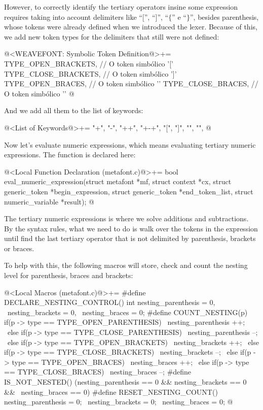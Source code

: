However, to correctly identify the tertiary operators insine some
expression requires taking into account delimiters like ``['',
``]'', ``$\{$'' e ``$\}$'', besides parenthesis, whose tokens were
already defined when we introduced the lexer. Because of this, we add
new token types for the delimiters that still were not defined:

\iniciocodigo
@<WEAVEFONT: Symbolic Token Definition@>+=
TYPE_OPEN_BRACKETS,         // O token simbólico '['
TYPE_CLOSE_BRACKETS,        // O token simbólico ']'
TYPE_OPEN_BRACES,           // O token simbólico '{'
TYPE_CLOSE_BRACES,          // O token simbólico '}'
@
\fimcodigo

And we add all them to the list of keywords:

\iniciocodigo
@<List of Keywords@>+=
"+", "-", "++", "+-+", "[", "]", "{", "}",
@
\fimcodigo

Now let's evaluate numeric expressions, which means evaluating
tertiary numeric expressions. The function is declared here:

\iniciocodigo
@<Local Function Declaration (metafont.c)@>+=
bool eval_numeric_expression(struct metafont *mf, struct context *cx,
                             struct generic_token *begin_expression,
                             struct generic_token *end_token_list,
                             struct numeric_variable *result);
@
\fimcodigo

The tertiary numeric expressions is where we solve additions and
subtractions. By the syntax rules, what we need to do is walk over the
tokens in the expression until find the last tertiary operator that is
not delimited by parenthesis, brackets or braces.

To help with this, the following macros will store, check and count
the nesting level for parenthesis, braces and brackets:

\iniciocodigo
@<Local Macros (metafont.c)@>+=
#define DECLARE_NESTING_CONTROL() int nesting_parenthesis = 0, \
                                      nesting_brackets = 0, \
                                      nesting_braces = 0;
#define COUNT_NESTING(p) {if(p -> type == TYPE_OPEN_PARENTHESIS)           \
                               nesting_parenthesis ++;                    \
                             else if(p -> type == TYPE_CLOSE_PARENTHESIS) \
                               nesting_parenthesis --;                    \
                             else if(p -> type == TYPE_OPEN_BRACKETS)     \
                               nesting_brackets ++;                       \
                             else if(p -> type == TYPE_CLOSE_BRACKETS)    \
                               nesting_brackets --;                       \
                             else if(p -> type == TYPE_OPEN_BRACES)       \
                               nesting_braces ++;                         \
                             else if(p -> type == TYPE_CLOSE_BRACES)      \
                               nesting_braces --;}
#define IS_NOT_NESTED() (nesting_parenthesis == 0 && nesting_brackets == 0 && \
                         nesting_braces == 0)
#define RESET_NESTING_COUNT() nesting_parenthesis = 0; \
                              nesting_brackets = 0; \
                              nesting_braces = 0;
@
\fimcodigo

